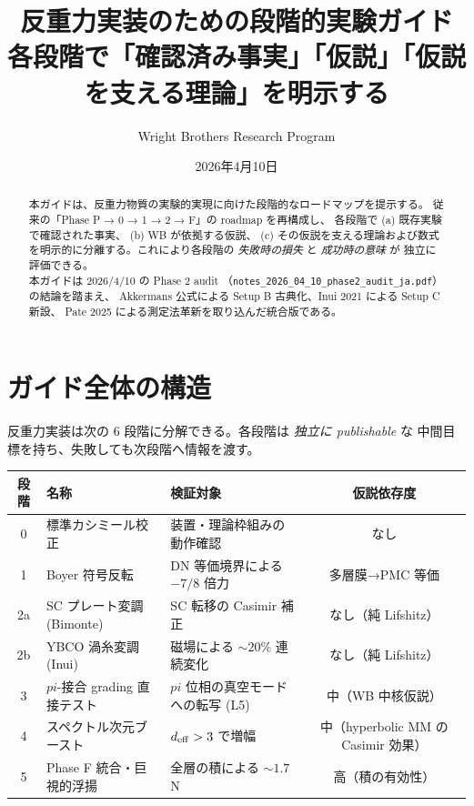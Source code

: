 \documentclass[11pt,a4paper]{article}
\title{反重力実装のための段階的実験ガイド\\[6pt]
\large 各段階で「確認済み事実」「仮説」「仮説を支える理論」を明示する}
\author{Wright Brothers Research Program}
\date{2026年4月10日}
\def\pi{pi}%
\def\textbf#1{#1}%
\begin{document}
\maketitle

\begin{abstract}
本ガイドは、反重力物質の実験的実現に向けた段階的なロードマップを提示する。
従来の「Phase P → 0 → 1 → 2 → F」の roadmap を再構成し、
各段階で
\textbf{(a) 既存実験で確認された事実}、
\textbf{(b) WB が依拠する仮説}、
\textbf{(c) その仮説を支える理論および数式}
を明示的に分離する。これにより各段階の \emph{失敗時の損失} と \emph{成功時の意味} が
独立に評価できる。\\
本ガイドは 2026/4/10 の Phase 2 audit
（\texttt{notes\_2026\_04\_10\_phase2\_audit\_ja.pdf}）の結論を踏まえ、
Akkermans 公式による Setup B 古典化、Inui 2021 による Setup C 新設、
Pate 2025 による測定法革新を取り込んだ統合版である。
\end{abstract}

\tableofcontents
\newpage

\section{ガイド全体の構造}

反重力実装は次の 6 段階に分解できる。各段階は \emph{独立に publishable} な
中間目標を持ち、失敗しても次段階へ情報を渡す。

\begin{center}
\renewcommand{\arraystretch}{1.3}
\begin{tabular}{cllc}
\toprule
段階 & 名称 & 検証対象 & 仮説依存度 \\
\midrule
0 & 標準カシミール校正 & 装置・理論枠組みの動作確認 & なし \\
1 & Boyer 符号反転 & DN 等価境界による $-7/8$ 倍力 & 多層膜→PMC 等価 \\
2a & SC プレート変調 (Bimonte) & SC 転移の Casimir 補正 & なし（純 Lifshitz） \\
2b & YBCO 渦糸変調 (Inui)    & 磁場による $\sim 20\%$ 連続変化 & なし（純 Lifshitz） \\
3 & $\pi$-接合 grading 直接テスト & $\pi$ 位相の真空モードへの転写 (L5) & 中（WB 中核仮説） \\
4 & スペクトル次元ブースト & $d_{\rm eff} > 3$ で増幅 & 中（hyperbolic MM の Casimir 効果） \\
5 & Phase F 統合・巨視的浮揚 & 全層の積による $\sim 1.7$ N & 高（積の有効性） \\
\bottomrule
\end{tabular}
\end{center}
\end{document}

